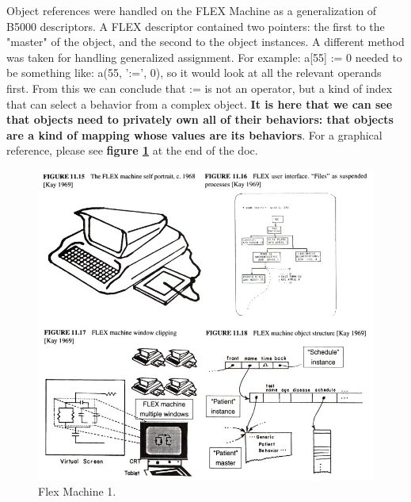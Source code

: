 \documentclass[letterpaper,12pt,parskip=full]{article}
\begin{document}
Object references were handled on the FLEX Machine as a generalization of B5000 descriptors. A FLEX descriptor contained two pointers: the first to the "master" of the object, and the second to the object instances. A different method was taken for handling generalized assignment. For example: a[55] := 0 needed to be something like: a(55, ':=', 0), so it would look at all the relevant operands first. From this we can conclude that := is not an operator, but a kind of index that can select a behavior from a complex object. \textbf{It is here that we can see that objects need to privately own all of their behaviors: that objects are a kind of mapping whose values are its behaviors}. For a graphical reference, please see \textbf{figure \ref{fig:flex_1}} at the end of the doc.

\begin{figure}[ht]
        \centering \includegraphics[scale=0.65]{FLEX_MACHINE_1.jpg}
        \caption{
                \label{fig:flex_1} %
                Flex Machine 1.
        }
\end{figure}
\end{document}
